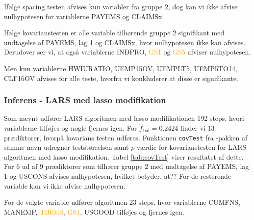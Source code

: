 Ifølge spacing testen afvises kun variabler fra gruppe 2, dog kan vi ikke afvise nulhypotesen for variablerne \textcolor{blue3}{PAYEMS} og \textcolor{blue3}{CLAIMSx}.

Ifølge kovarianstesten er alle variable tilhørende gruppe 2 signifikant med undtagelse af \textcolor{blue3}{PAYEMS}, \textcolor{blue3}{lag 1} og \textcolor{blue3}{CLAIMSx}, hvor nulhypotesen ikke kan afvises. 
Derudover ser vi, at også variablerne \textcolor{chartreuse4}{INDPRO}, \textcolor{orange}{GS1} og \textcolor{orange}{GS5} afviser nulhypotesen.

Men kun variablerne \textcolor{blue3}{HWIURATIO}, \textcolor{blue3}{UEMP15OV}, \textcolor{blue3}{UEMPLT5}, \textcolor{blue3}{UEMP5TO14}, \textcolor{blue3}{CLF16OV} afvises for alle teste, hvorfra vi konkluderer at disse er signifikante.



\newpage
\subsubsection{Inferens - LARS med lasso modifikation}
Som nævnt udfører LARS algoritmen med lasso modifikationen 192 steps, hvori variablerne tilføjes og nogle fjernes igen.
For \(\widehat{f}_{1\text{sd}}=0.2424\) finder vi 13 prædiktorer, hvorpå kovarians testen udføres.
Funktionen \texttt{covTest} fra \Rlang-pakken af samme navn udregner teststørrelsen samt \(p\)-værdie for kovarianstesten for LARS algoritmen med lasso modifikation.
Tabel \ref{tab:covTest} viser resultatet af dette.
For 6 ud af 9 prædiktorer som tilhører gruppe 2 med undtagelse af \textcolor{blue3}{PAYEMS}, \textcolor{blue3}{lag 1} og \textcolor{blue3}{USCONS} afvises nulhypotesen, hvilket betyder, at??
For de resterende variable kan vi ikke afvise nulhypotesen.
%

%
For de valgte variable udfører algoritmen 23 steps, hvor variablerne  \textcolor{chartreuse4}{CUMFNS}, \textcolor{blue3}{MANEMP}, \textcolor{orange}{TB6MS}, \textcolor{orange}{GS1}, \textcolor{blue3}{USGOOD} tilføjes og fjernes igen.




\newpage


%
